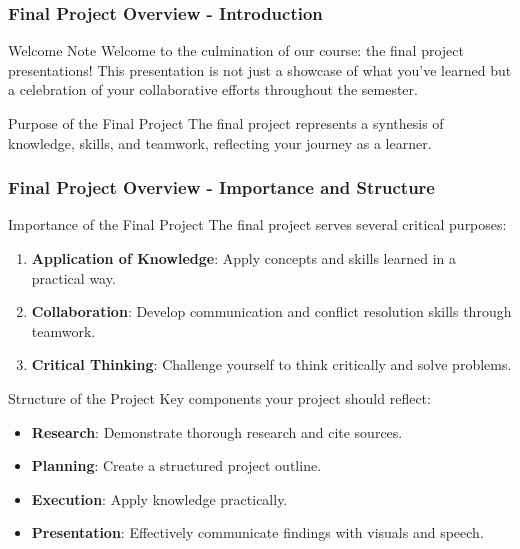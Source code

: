 \documentclass[aspectratio=169]{beamer}
\begin{document}
\frame{\titlepage}

\begin{frame}[fragile]
    \frametitle{Final Project Overview - Introduction}
    \begin{block}{Welcome Note}
        Welcome to the culmination of our course: the final project presentations! 
        This presentation is not just a showcase of what you've learned but a celebration 
        of your collaborative efforts throughout the semester.
    \end{block}
    \begin{block}{Purpose of the Final Project}
        The final project represents a synthesis of knowledge, skills, and teamwork, 
        reflecting your journey as a learner.
    \end{block}
\end{frame}

\begin{frame}[fragile]
    \frametitle{Final Project Overview - Importance and Structure}
    \begin{block}{Importance of the Final Project}
        The final project serves several critical purposes:
        \begin{enumerate}
            \item \textbf{Application of Knowledge}: Apply concepts and skills learned in a practical way.
            \item \textbf{Collaboration}: Develop communication and conflict resolution skills through teamwork.
            \item \textbf{Critical Thinking}: Challenge yourself to think critically and solve problems.
        \end{enumerate}
    \end{block}
    \begin{block}{Structure of the Project}
        Key components your project should reflect:
        \begin{itemize}
            \item \textbf{Research}: Demonstrate thorough research and cite sources.
            \item \textbf{Planning}: Create a structured project outline.
            \item \textbf{Execution}: Apply knowledge practically.
            \item \textbf{Presentation}: Effectively communicate findings with visuals and speech.
        \end{itemize}
    \end{block}
\end{frame}
\end{document}
